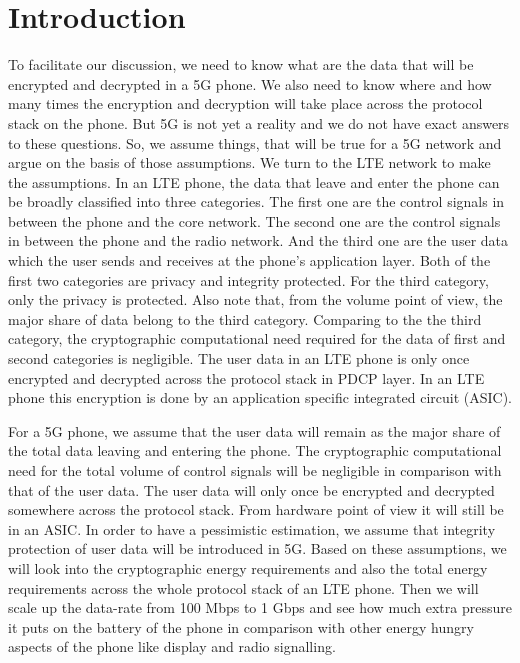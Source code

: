 \section{Introduction}
\label{intro} To facilitate our discussion, we need to know what are the data that will be encrypted and decrypted in a 5G phone. We also need to know where and how many times the encryption and decryption will take place across the protocol stack on the phone. But 5G is not yet a reality and we do not have exact answers to these questions. So, we assume things, that will be true for a 5G network and argue on the basis of those assumptions. We turn to the LTE network to make the assumptions. In an LTE phone, the data that leave and enter the phone can be broadly classified into three categories. The first one are the control signals in between the phone and the core network. The second one are the control signals in between the phone and the radio network. And the third one are the user data which the user sends and receives at the phone's application layer. Both of the first two categories are privacy and integrity protected. For the third category, only the privacy is protected. Also note that, from the volume point of view, the major share of data belong to the third category. Comparing to the the third category, the cryptographic computational need required for the data of first and second categories is negligible. The user data in an LTE phone is only once encrypted and decrypted across the protocol stack in PDCP layer. In an LTE phone this encryption is done by an application specific integrated circuit (ASIC).

For a 5G phone, we assume that the user data will remain as the major share of the total data leaving and entering the phone. The cryptographic computational need for the total volume of control signals will be negligible in comparison with that of the user data. The user data will only once be encrypted and decrypted somewhere across the protocol stack. From hardware point of view it will still be in an ASIC. In order to have a pessimistic estimation, we assume that integrity protection of user data will be introduced in 5G. Based on these assumptions, we will look into the cryptographic energy requirements and also the total energy requirements across the whole protocol stack of an LTE phone. Then we will scale up the data-rate from 100 Mbps to 1 Gbps and see how much extra pressure it puts on the battery of the phone in comparison with other energy hungry aspects of the phone like display and radio signalling.

